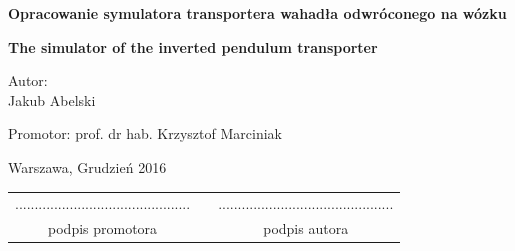\documentclass[12pt, oneside]{report}
\theoremstyle{definition}
\begin{document}
\begin{titlepage}
\linespread{1.5}
\begin{center}
\Huge
\textbf{Opracowanie symulatora transportera wahadła odwróconego na wózku}
\end{center}

\begin{center}
\Large
\textbf{The simulator of the inverted pendulum transporter}
\end{center}


\vfill
\begin{center}
\Large
Autor:\\
\LARGE Jakub Abelski
\end{center}
\vfill
\begin{center}
\Large
Promotor: prof. dr hab. Krzysztof Marciniak
\end{center}
\vfill
\begin{center}
\large
Warszawa, Grudzień 2016
\end{center}

\newpage
\hfill
\begin{table}[b]
\centering
\begin{tabular}[t]{ccc}
............................................. & \hspace*{100pt} & .............................................\\
podpis promotora & \hspace*{100pt} & podpis autora
\end{tabular}
\end{table}
\end{titlepage}

\setlength{\parindent}{5ex}
\end{document}

